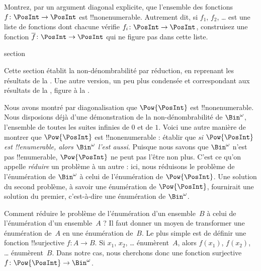 \documentclass[11pt,a4paper,openany]{memoir}
\begin{document}
\begin{prob}\label{sfr:siz:nen:prob:f-posint}
Montrez, par un argument diagonal explicite, que l’ensemble
des fonctions $f \colon \PosInt \to \PosInt$ est !!{nonenumerable}.
Autrement dit, si $f_1$, $f_2$, \dots{} est une liste de fonctions
dont chacune vérifie $f_i\colon \PosInt \to \PosInt$, construisez
une fonction $\overline{f}\colon \PosInt \to \PosInt$ qui ne figure
pas dans cette liste.
\end{prob}


\endgroup



\begingroup
\expandafter\def\csname ol@sectioncs\endcsname{section}
\def\olfilename{reduction}




\begin{editorial}
  Cette section établit la non-dénombrabilité par réduction, en reprenant
  les résultats de la . Une autre version, un peu plus
  condensée et correspondant aux résultats de la ,
  figure à la .
\end{editorial}

Nous avons montré par diagonalisation que $\Pow{\PosInt}$ est
!!{nonenumerable}. Nous disposions déjà d'une démonstration de la
non-dénombrabilité de $\Bin^\omega$, l'ensemble de toutes les suites
infinies de $0$ et de $1$. Voici une autre manière de montrer que
$\Pow{\PosInt}$ est !!{nonenumerable} : établir que \emph{si
$\Pow{\PosInt}$ est !!{enumerable}, alors $\Bin^\omega$ l'est aussi}.
Puisque nous savons que $\Bin^\omega$ n'est pas !!{enumerable},
$\Pow{\PosInt}$ ne peut pas l'être non plus. C'est ce qu'on appelle
\emph{réduire} un problème à un autre : ici, nous réduisons le problème
de l'énumération de $\Bin^\omega$ à celui de l'énumération de
$\Pow{\PosInt}$. Une solution du second problème, à savoir une
énumération de $\Pow{\PosInt}$, fournirait une solution du premier,
c'est-à-dire une énumération de $\Bin^\omega$.

Comment réduire le problème de l'énumération d'un ensemble~$B$ à celui
de l'énumération d'un ensemble~$A$ ? Il faut donner un moyen de
transformer une énumération de~$A$ en une énumération de~$B$. Le plus
simple est de définir une fonction !!{surjective} $f\colon A \to B$.
Si $x_1$, $x_2$, \dots{} énumèrent~$A$, alors $f(x_1)$, $f(x_2)$,
\dots{} énumèrent~$B$. Dans notre cas, nous cherchons donc une fonction
surjective $f\colon \Pow{\PosInt} \to \Bin^\omega$.
\end{document}
